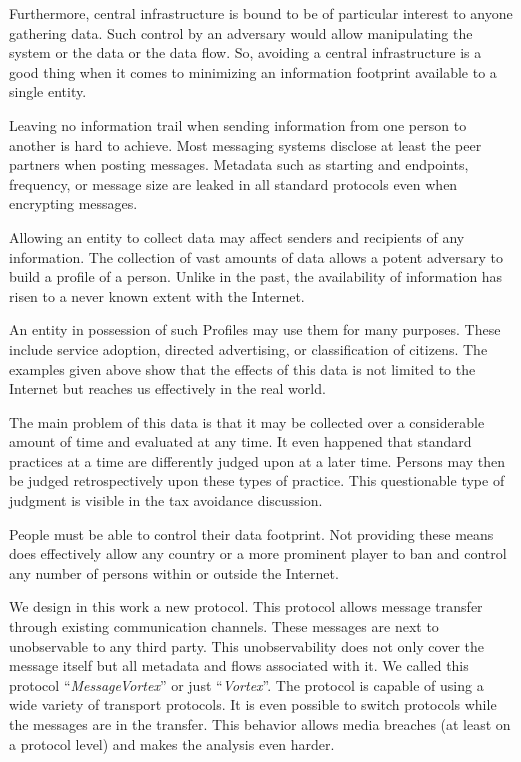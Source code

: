 Furthermore, central infrastructure is bound to be of particular interest to anyone gathering data. Such control by an adversary would allow manipulating the system or the data or the data flow. So, avoiding a central infrastructure is a good thing when it comes to minimizing an information footprint available to a single entity.

Leaving no information trail when sending information from one person to another is hard to achieve. Most messaging systems disclose at least the peer partners when posting messages. Metadata such as starting and endpoints, frequency, or message size are leaked in all standard protocols even when encrypting messages.

Allowing an entity to collect data may affect senders and recipients of any information. The collection of vast amounts of data allows a potent adversary to build a  profile of a person. Unlike in the past, the availability of information has risen to a never known extent with the Internet.

An entity in possession of such Profiles may use them for many purposes. These include service adoption, directed advertising, or classification of citizens. The examples given above show that the effects of this data is not limited to the Internet but reaches us effectively in the real world.

The main problem of this data is that it may be collected over a considerable amount of time and evaluated at any time. It even happened that standard practices at a time are differently judged upon at a later time. Persons may then be judged retrospectively upon these types of practice. This questionable type of judgment is visible in the tax avoidance discussion\cite{Amat1999}. 

People must be able to control their data footprint. Not providing these means does effectively allow any country or a more prominent player to ban and control any number of persons within or outside the Internet. 

We design in this work a new protocol. This protocol allows message transfer through existing communication channels. These messages are next to unobservable to any third party. This unobservability does not only cover the message itself but all metadata and flows associated with it. We called this protocol ``\emph{MessageVortex}'' or just ``\emph{Vortex}''. The protocol is capable of using a wide variety of transport protocols. It is even possible to switch protocols while the messages are in the transfer. This behavior allows media breaches (at least on a protocol level) and makes the analysis even harder.

